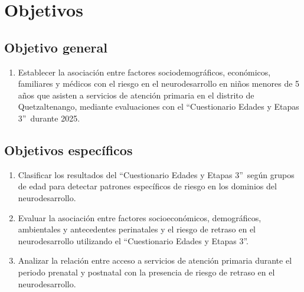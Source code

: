 \documentclass[11pt,letterpaper]{report}
\newcommand{\asq}{“Cuestionario Edades y Etapas 3”}
\begin{document}
	\chapter{Objetivos}
\section{Objetivo general}
	\begin{enumerate}
		\item Establecer la asociación entre factores sociodemográficos,
		económicos, familiares y médicos con el riesgo en el neurodesarrollo en
		niños menores de 5 años que asisten a servicios de atención primaria en
		el distrito de Quetzaltenango, mediante evaluaciones con el \asq\
		durante 2025.
	\end{enumerate}
\section{Objetivos específicos}
	\begin{enumerate}
		\item Clasificar los resultados del \asq\ según grupos de edad para
		detectar patrones específicos de riesgo en los dominios del
		neurodesarrollo.
		
		\item Evaluar la asociación entre factores socioeconómicos,
		demográficos, ambientales y antecedentes perinatales y el riesgo de
		retraso en el neurodesarrollo utilizando el \asq.
		
		\item Analizar la relación entre acceso a servicios de atención
		primaria durante el periodo prenatal y postnatal con la presencia de
		riesgo de retraso en el neurodesarrollo.
	\end{enumerate}
\end{document}
